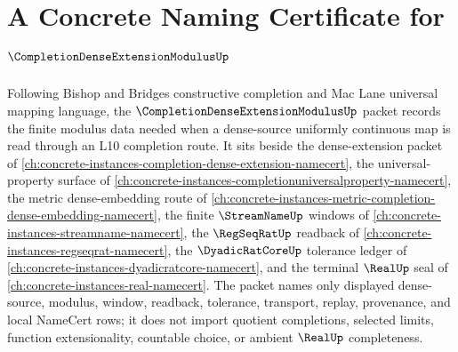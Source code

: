 \chapter{A Concrete Naming Certificate for $\CompletionDenseExtensionModulusUp$}
\label{ch:concrete-instances-completion-dense-extension-modulus-namecert}

Following Bishop and Bridges constructive completion and Mac Lane universal mapping language, the $\CompletionDenseExtensionModulusUp$ packet records the finite modulus data needed when a dense-source uniformly continuous map is read through an L10 completion route. It sits beside the dense-extension packet of \autoref{ch:concrete-instances-completion-dense-extension-namecert}, the universal-property surface of \autoref{ch:concrete-instances-completionuniversalproperty-namecert}, the metric dense-embedding route of \autoref{ch:concrete-instances-metric-completion-dense-embedding-namecert}, the finite $\StreamNameUp$ windows of \autoref{ch:concrete-instances-streamname-namecert}, the $\RegSeqRatUp$ readback of \autoref{ch:concrete-instances-regseqrat-namecert}, the $\DyadicRatCoreUp$ tolerance ledger of \autoref{ch:concrete-instances-dyadicratcore-namecert}, and the terminal $\RealUp$ seal of \autoref{ch:concrete-instances-real-namecert}. The packet names only displayed dense-source, modulus, window, readback, tolerance, transport, replay, provenance, and local NameCert rows; it does not import quotient completions, selected limits, function extensionality, countable choice, or ambient $\RealUp$ completeness.

